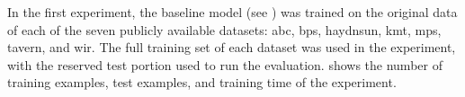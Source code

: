 
In the first experiment, the baseline model (see
) was trained on the original data
of each of the seven publicly available datasets: \gls{abc},
\gls{bps}, \gls{haydnsun}, \gls{kmt}, \gls{mps},
\gls{tavern}, and \gls{wir}. The full training set of each
dataset was used in the experiment, with the reserved test
portion used to run the evaluation.
 shows the number of training
examples, test examples, and training time of the
experiment. 

